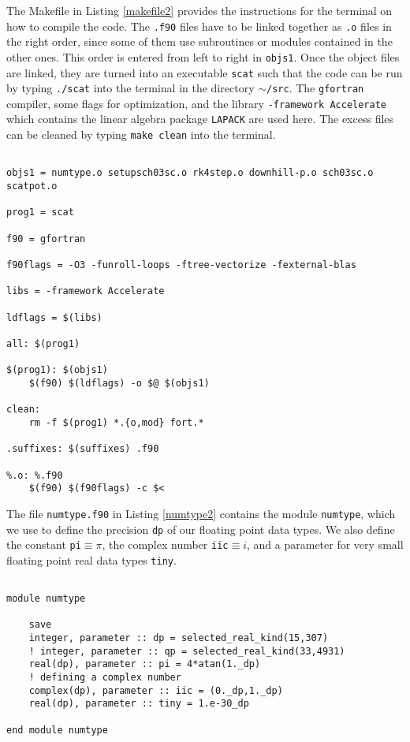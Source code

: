 \documentclass[12pt]{article}
\begin{document}
The Makefile in Listing \ref{makefile2} provides the instructions for the terminal on how to compile the code.  The {\tt *.f90} files have to be linked together as {\tt *.o} files in the right order, since some of them use subroutines or modules contained in the other ones.  This order is entered from left to right in {\tt objs1}.  Once the object files are linked, they are turned into an executable {\tt scat} such that the code can be run by typing {\tt ./scat} into the terminal in the directory {\tt $\sim$/src}.  The {\tt gfortran} compiler, some flags for optimization, and the library {\tt -framework Accelerate} which contains the linear algebra package {\tt LAPACK} are used here.  The excess files can be cleaned by typing {\tt make clean} into the terminal.

\begin{lstlisting}[frame=single,caption={{\tt Makefile}},label=makefile2]

objs1 = numtype.o setupsch03sc.o rk4step.o downhill-p.o sch03sc.o scatpot.o

prog1 = scat

f90 = gfortran

f90flags = -O3 -funroll-loops -ftree-vectorize -fexternal-blas

libs = -framework Accelerate

ldflags = $(libs)

all: $(prog1)

$(prog1): $(objs1)
	$(f90) $(ldflags) -o $@ $(objs1)

clean: 
	rm -f $(prog1) *.{o,mod} fort.*

.suffixes: $(suffixes) .f90

%.o: %.f90
	$(f90) $(f90flags) -c $<

\end{lstlisting}

The file {\tt numtype.f90} in Listing \ref{numtype2} contains the module {\tt numtype}, which we use to define the precision {\tt dp} of our floating point data types.  We also define the constant {\tt pi}$\equiv\pi$, the complex number {\tt iic}$\equiv i$, and a parameter for very small floating point real data types {\tt tiny}.

\begin{lstlisting}[frame=single,caption={{\tt numtype.f90}},label=numtype2]

module numtype

    save
    integer, parameter :: dp = selected_real_kind(15,307)
    ! integer, parameter :: qp = selected_real_kind(33,4931)
    real(dp), parameter :: pi = 4*atan(1._dp)
    ! defining a complex number
    complex(dp), parameter :: iic = (0._dp,1._dp)
    real(dp), parameter :: tiny = 1.e-30_dp

end module numtype

\end{lstlisting}
\end{document}

